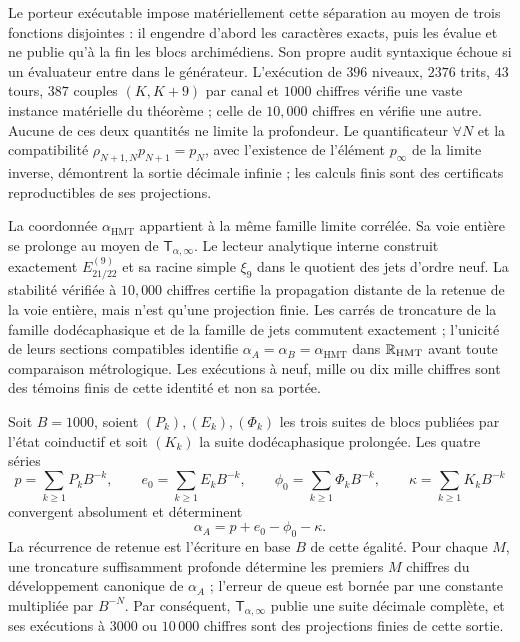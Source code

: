 Le porteur exécutable impose matériellement cette séparation au moyen de trois
fonctions disjointes : il engendre d'abord les caractères exacts, puis les évalue
et ne publie qu'à la fin les blocs archimédiens. Son propre audit syntaxique
échoue si un évaluateur entre dans le générateur. L'exécution de \(396\) niveaux,
\(2376\) trits, \(43\) tours, \(387\) couples \((K,K+9)\) par canal et
\(1000\) chiffres vérifie une vaste instance matérielle du théorème ; celle de
\(10,000\) chiffres en vérifie une autre. Aucune de ces deux quantités ne limite la
profondeur. Le quantificateur \(\forall N\) et la compatibilité
\(\rho_{N+1,N}p_{N+1}=p_N\), avec l'existence de l'élément
\(p_\infty\) de la limite inverse, démontrent la sortie décimale infinie ; les
calculs finis sont des certificats reproductibles de ses projections.

La coordonnée \(\alpha_{\mathrm{HMT}}\) appartient à la même famille limite
corrélée. Sa voie entière se prolonge au moyen de
\(\mathsf T_{\alpha,\infty}\). Le lecteur
analytique interne construit exactement \(E_{21/22}^{(9)}\) et sa racine simple
\(\xi_9\) dans le quotient des jets d'ordre neuf. La stabilité vérifiée à
\(10,000\) chiffres certifie la propagation distante de la retenue de la voie
entière, mais n'est qu'une projection finie. Les carrés de troncature de
la famille dodécaphasique et de la famille de jets commutent exactement ;
l'unicité de leurs sections compatibles identifie
\(\alpha_A=\alpha_B=\alpha_{\mathrm{HMT}}\) dans
\(\mathbb R_{\rm HMT}\) avant toute comparaison métrologique. Les exécutions à
neuf, mille ou dix mille chiffres sont des témoins finis de cette identité et non sa
portée.

\begin{proposition}
\label{prop:c27-alpha-prolongacion-completa}
Soit \(B=1000\), soient \((P_k),(E_k),(\Phi_k)\) les trois suites de blocs
publiées par l'état coinductif et soit \((K_k)\) la suite
dodécaphasique prolongée. Les quatre séries
\[
 p=\sum_{k\geq1}P_kB^{-k},\qquad
 e_0=\sum_{k\geq1}E_kB^{-k},\qquad
 \phi_0=\sum_{k\geq1}\Phi_kB^{-k},\qquad
 \kappa=\sum_{k\geq1}K_kB^{-k}
\]
convergent absolument et déterminent
\[
 \alpha_A=p+e_0-\phi_0-\kappa.
\]
La récurrence de retenue est l'écriture en base \(B\) de cette égalité.
Pour chaque \(M\), une troncature suffisamment profonde détermine les
premiers \(M\) chiffres du développement canonique de \(\alpha_A\) ; l'erreur de
queue est bornée par une constante multipliée par \(B^{-N}\). Par
conséquent, \(\mathsf T_{\alpha,\infty}\) publie une suite décimale
complète, et ses exécutions à \(3000\) ou \(10\,000\) chiffres sont des projections
finies de cette sortie.
\end{proposition}

